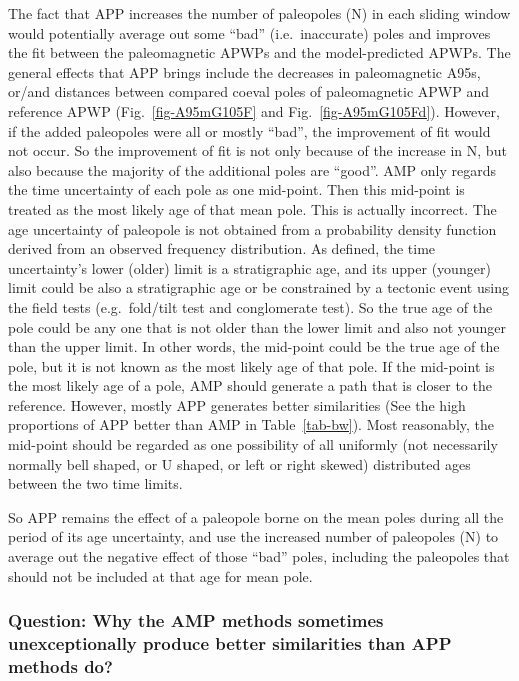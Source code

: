 The fact that APP increases the number of paleopoles (N) in each sliding window
would potentially average out some ``bad'' (i.e.\ inaccurate) poles and improves
the fit between the paleomagnetic APWPs and the model-predicted APWPs. The
general effects that APP brings include the decreases in paleomagnetic A95s,
or/and distances between compared coeval poles of paleomagnetic APWP and
reference APWP (Fig.~\ref{fig-A95mG105F} and Fig.~\ref{fig-A95mG105Fd}).
However, if the added paleopoles were all or mostly ``bad'', the improvement of
fit would not occur. So the improvement of fit is not only because of the
increase in N, but also because the majority of the additional poles are
``good''. AMP only regards the time uncertainty of each pole as one mid-point.
Then this mid-point is treated as the most likely age of that mean pole. This is
actually incorrect. The age uncertainty of paleopole is not obtained from a
probability density function derived from an observed frequency distribution. As
defined, the time uncertainty's lower (older) limit is a stratigraphic age, and
its upper (younger) limit could be also a stratigraphic age or be constrained by
a tectonic event using the field tests (e.g.\ fold/tilt test and conglomerate
test). So the true age of the pole could be any one that is not older than the
lower limit and also not younger than the upper limit. In other words, the
mid-point could be the true age of the pole, but it is not known as the most
likely age of that pole. If the mid-point is the most likely age of a pole, AMP
should generate a path that is closer to the reference. However, mostly APP
generates better similarities (See the high proportions of APP better than AMP
in Table~\ref{tab-bw}). Most reasonably, the mid-point should be regarded as
one possibility of all uniformly (not necessarily normally bell shaped, or U
shaped, or left or right skewed) distributed ages between the two time limits.

So APP remains the effect of a paleopole borne on the mean poles during all the
period of its age uncertainty, and use the increased number of paleopoles (N)
to average out the negative effect of those ``bad'' poles, including the
paleopoles that should not be included at that age for mean pole.

\subsubsection{Question: Why the AMP methods sometimes unexceptionally produce
better similarities than APP methods do?}

